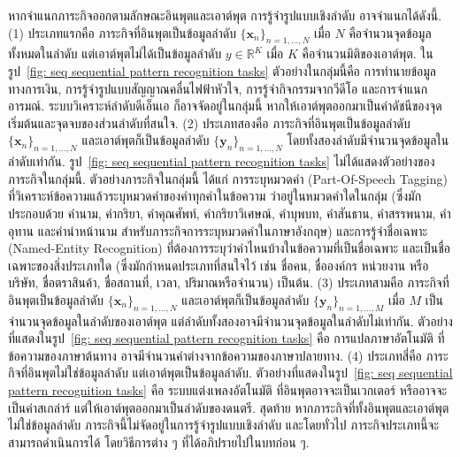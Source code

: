 หากจำแนกภาระกิจออกตามลักษณะอินพุตและเอาต์พุต การรู้จำรูปแบบเชิงลำดับ อาจจำแนกได้ดังนี้.
(1)
ประเภทแรกคือ ภาระกิจที่อินพุตเป็นข้อมูลลำดับ $\{\bm{x}_n\}_{n=1,\ldots, N}$ เมื่อ $N$ คือจำนวนจุดข้อมูลทั้งหมดในลำดับ 
แต่เอาต์พุตไม่ได้เป็นข้อมูลลำดับ $y \in \mathbb{R}^K$ เมื่อ $K$ คือจำนวนมิติของเอาต์พุต.
ในรูป~\ref{fig: seq sequential pattern recognition tasks} 
ตัวอย่างในกลุ่มนี้คือ การทำนายข้อมูลทางการเงิน, การรู้จำรูปแบบสัญญาณคลื่นไฟฟ้าหัวใจ, การรู้จำกิจกรรมจากวีดีโอ และการจำแนกอารมณ์.
ระบบวิเคราะห์ลำดับดีเอ็นเอ ก็อาจจัดอยู่ในกลุ่มนี้ หากให้เอาต์พุตออกมาเป็นค่าดัชนีของจุดเริ่มต้นและจุดจบของส่วนลำดับที่สนใจ.
(2) ประเภทสองคือ
ภาระกิจที่อินพุตเป็นข้อมูลลำดับ $\{\bm{x}_n\}_{n=1,\ldots, N}$  
และเอาต์พุตก็เป็นข้อมูลลำดับ $\{\bm{y}_n\}_{n=1,\ldots, N}$ โดยทั้งสองลำดับมีจำนวนจุดข้อมูลในลำดับเท่ากัน.
รูป~\ref{fig: seq sequential pattern recognition tasks} ไม่ได้แสดงตัวอย่างของภาระกิจในกลุ่มนี้.
ตัวอย่างภาระกิจในกลุ่มนี้ ได้แก่ การระบุหมวดคำ (Part-Of-Speech Tagging) 
ที่วิเคราะห์ข้อความแล้วระบุหมวดคำของคำทุกคำในข้อความ ว่าอยู่ในหมวดคำใดในกลุ่ม (ซึ่งมักประกอบด้วย 
คำนาม, คำกริยา, คำคุณศัพท์, คำกริยาวิเศษณ์, คำบุพบท, คำสันธาน, คำสรรพนาม, คำอุทาน และคำนำหน้านาม 
สำหรับภาระกิจการระบุหมวดคำในภาษาอังกฤษ)
%
และการรู้จำชื่อเฉพาะ (Named-Entity Recognition) 
ที่ต้องการระบุว่าคำไหนบ้างในข้อความที่เป็นชื่อเฉพาะ และเป็นชื่อเฉพาะของสิ่งประเภทใด (ซึ่งมักกำหนดประเภทที่สนใจไว้ เช่น ชื่อคน, ชื่อองค์กร หน่วยงาน หรือบริษัท, ชื่อตราสินค้า, ชื่อสถานที่, เวลา, ปริมาณหรือจำนวน)
เป็นต้น.
(3)
ประเภทสามคือ
ภาระกิจที่อินพุตเป็นข้อมูลลำดับ $\{\bm{x}_n\}_{n=1,\ldots, N}$  
และเอาต์พุตก็เป็นข้อมูลลำดับ $\{\bm{y}_n\}_{n=1,\ldots, M}$ เมื่อ $M$ เป็นจำนวนจุดข้อมูลในลำดับของเอาต์พุต แต่ลำดับทั้งสองอาจมีจำนวนจุดข้อมูลในลำดับไม่เท่ากัน.
ตัวอย่างที่แสดงในรูป~\ref{fig: seq sequential pattern recognition tasks}
คือ การแปลภาษาอัตโนมัติ ที่ข้อความของภาษาต้นทาง อาจมีจำนวนคำต่างจากข้อความของภาษาปลายทาง.
(4)
ประเภทสี่คือ
ภาระกิจที่อินพุตไม่ใช่ข้อมูลลำดับ แต่เอาต์พุตเป็นข้อมูลลำดับ.
ตัวอย่างที่แสดงในรูป~\ref{fig: seq sequential pattern recognition tasks}
คือ ระบบแต่งเพลงอัตโนมัติ ที่อินพุตอาจจะเป็นเวกเตอร์ หรืออาจจะเป็นค่าสเกล่าร์ 
แต่ให้เอาต์พุตออกมาเป็นลำดับของดนตรี.
สุดท้าย หากภาระกิจที่ทั้งอินพุตและเอาต์พุตไม่ใช่ข้อมูลลำดับ ภาระกิจนี้ไม่จัดอยู่ในการรู้จำรูปแบบเชิงลำดับ 
และโดยทั่วไป ภาระกิจประเภทนี้จะสามารถดำเนินการได้ โดยวิธีการต่าง ๆ ที่ได้อภิปรายไปในบทก่อน ๆ.

